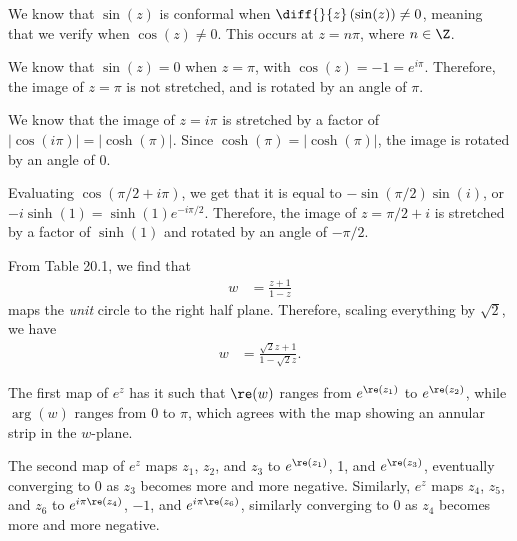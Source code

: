 \documentclass[10pt]{mypackage}
\begin{document}
\RaggedRight
\begin{solution}[20.1]
  We know that $\sin(z)$ is conformal when $\diff{}{z}\left( \sin(z) \right) \neq 0$, meaning that we verify when $\cos(z) \neq 0$. This occurs at $z = n\pi$, where $n\in \Z$.\newline

  We know that $\sin(z) = 0$ when $z = \pi$, with $\cos(z) = -1 = e^{i\pi}$. Therefore, the image of $z = \pi$ is not stretched, and is rotated by an angle of $\pi$.\newline

  We know that the image of $z = i\pi$ is stretched by a factor of $\left\vert \cos\left( i\pi \right) \right\vert = \left\vert \cosh\left( \pi \right) \right\vert$. Since $\cosh\left( \pi \right) = \left\vert \cosh\left( \pi \right) \right\vert$, the image is rotated by an angle of $0$.\newline

  Evaluating $\cos\left( \pi/2 + i\pi\right)$, we get that it is equal to $-\sin\left( \pi/2 \right)\sin\left( i \right)$, or $-i\sinh(1) = \sinh(1)e^{-i\pi/2}$. Therefore, the image of $z = \pi/2 + i$ is stretched by a factor of $\sinh(1)$ and rotated by an angle of $-\pi/2$.
\end{solution}
\begin{solution}[20.9]
  From Table 20.1, we find that
  \begin{align*}
    w &= \frac{z+1}{1-z}
  \end{align*}
  maps the \textit{unit} circle to the right half plane. Therefore, scaling everything by $\sqrt{2}$, we have
  \begin{align*}
    w &= \frac{\sqrt{2}z + 1}{1 - \sqrt{2}z}.
  \end{align*}
\end{solution}
\begin{solution}[20.10]
  The first map of $e^z$ has it such that $\re(w)$ ranges from $e^{\re\left(z_1\right)}$ to $e^{\re\left( z_2 \right)}$, while $\arg(w)$ ranges from $0$ to $\pi$, which agrees with the map showing an annular strip in the $w$-plane.\newline

  The second map of $e^{z}$ maps $z_1$, $z_2$, and $z_3$ to $e^{\re\left( z_1 \right)}$, 1, and $e^{\re\left( z_3 \right)}$, eventually converging to $0$ as $z_3$ becomes more and more negative. Similarly, $e^{z}$ maps $z_4$, $z_5$, and $z_6$ to $e^{i\pi\re\left( z_4 \right)}$, $-1$, and $e^{i\pi\re\left( z_6 \right)}$, similarly converging to $0$ as $z_4$ becomes more and more negative.
\end{solution}
\end{document}
